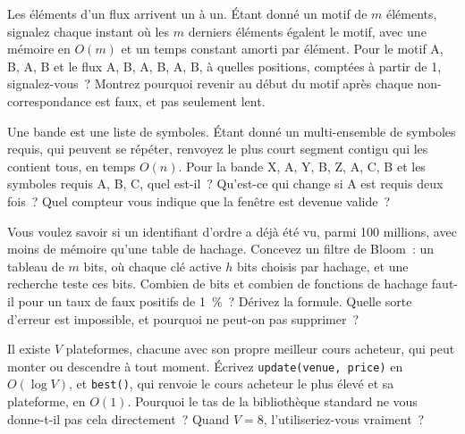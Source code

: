 \begin{question}\label{iq:iv3:algorithms:60}
Les éléments d'un flux arrivent un à un. Étant donné un motif de $m$ éléments, signalez chaque instant où les $m$ derniers éléments égalent le motif, avec une mémoire en $O(m)$ et un temps constant amorti par élément. Pour le motif A, B, A, B et le flux A, B, A, B, A, B, à quelles positions, comptées à partir de 1, signalez-vous~? Montrez pourquoi revenir au début du motif après chaque non-correspondance est faux, et pas seulement lent.
\end{question}

\begin{question}\label{iq:iv3:algorithms:61}
Une bande est une liste de symboles. Étant donné un multi-ensemble de symboles requis, qui peuvent se répéter, renvoyez le plus court segment contigu qui les contient tous, en temps $O(n)$. Pour la bande X, A, Y, B, Z, A, C, B et les symboles requis A, B, C, quel est-il~? Qu'est-ce qui change si A est requis deux fois~? Quel compteur vous indique que la fenêtre est devenue valide~?
\end{question}

\begin{question}\label{iq:iv3:algorithms:62}
Vous voulez savoir si un identifiant d'ordre a déjà été vu, parmi 100 millions, avec moins de mémoire qu'une table de hachage. Concevez un filtre de Bloom~: un tableau de $m$ bits, où chaque clé active $h$ bits choisis par hachage, et une recherche teste ces bits. Combien de bits et combien de fonctions de hachage faut-il pour un taux de faux positifs de 1~\%~? Dérivez la formule. Quelle sorte d'erreur est impossible, et pourquoi ne peut-on pas supprimer~?
\end{question}

\begin{question}\label{iq:iv3:algorithms:63}
Il existe $V$ plateformes, chacune avec son propre meilleur cours acheteur, qui peut monter ou descendre à tout moment. Écrivez \texttt{update(venue, price)} en $O(\log V)$, et \texttt{best()}, qui renvoie le cours acheteur le plus élevé et sa plateforme, en $O(1)$. Pourquoi le tas de la bibliothèque standard ne vous donne-t-il pas cela directement~? Quand $V = 8$, l'utiliseriez-vous vraiment~?
\end{question}

